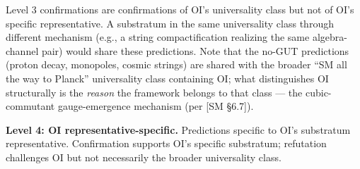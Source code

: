 \documentclass[
]{article}
\begin{document}
Level 3 confirmations are confirmations of OI's universality class but
not of OI's specific representative. A substratum in the same
universality class through different mechanism (e.g., a string
compactification realizing the same algebra-channel pair) would share
these predictions. Note that the no-GUT predictions (proton decay,
monopoles, cosmic strings) are shared with the broader ``SM all the way
to Planck'' universality class containing OI; what distinguishes OI
structurally is the \emph{reason} the framework belongs to that class
--- the cubic-commutant gauge-emergence mechanism (per {[}SM §6.7{]}).

\textbf{Level 4: OI representative-specific.} Predictions specific to
OI's substratum representative. Confirmation supports OI's specific
substratum; refutation challenges OI but not necessarily the broader
universality class.
\end{document}
